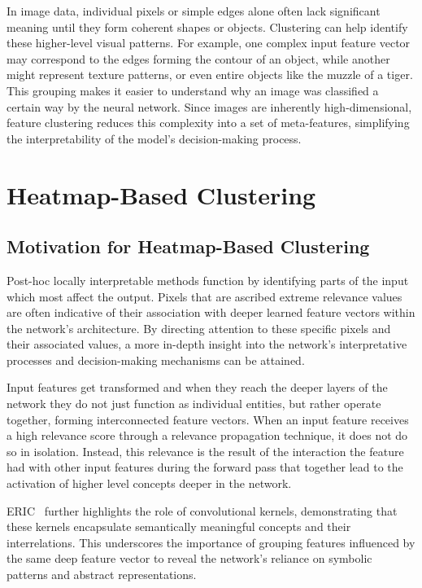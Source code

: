 In image data, individual pixels or simple edges alone often lack significant meaning until they form coherent shapes or objects. Clustering can help identify these higher-level visual patterns. For example, one complex input feature vector may correspond to the edges forming the contour of an object, while another might represent texture patterns, or even entire objects like the muzzle of a tiger. This grouping makes it easier to understand why an image was classified a certain way by the neural network. Since images are inherently high-dimensional, feature clustering reduces this complexity into a set of meta-features, simplifying the interpretability of the model's decision-making process.


\section{Heatmap-Based Clustering}
\label{heatmap_clustering}

\subsection{Motivation for Heatmap-Based Clustering}

Post-hoc locally interpretable methods function by identifying parts of the input which most affect the output. Pixels that are ascribed extreme relevance values are often indicative of their association with deeper learned feature vectors within the network's architecture. By directing attention to these specific pixels and their associated values, a more in-depth insight into the network's interpretative processes and decision-making mechanisms can be attained.

Input features get transformed and when they reach the deeper layers of the network they do not just function as individual entities, but rather operate together, forming interconnected feature vectors. When an input feature receives a high relevance score through a relevance propagation technique, it does not do so in isolation. Instead, this relevance is the result of the interaction the feature had with other input features during the forward pass that together lead to the activation of higher level concepts deeper in the network.

ERIC~\cite{townsend2020ericextractingrelationsinferred} further highlights the role of convolutional kernels, demonstrating that these kernels encapsulate semantically meaningful concepts and their interrelations. This underscores the importance of grouping features influenced by the same deep feature vector to reveal the network's reliance on symbolic patterns and abstract representations.

